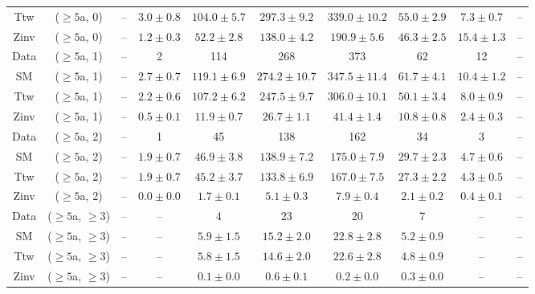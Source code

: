 \begin{table}[h!]
{\begin{tabular}{cccccccccc}
	Ttw & ($\ge5$a, 0) & -- & $3.0\pm 0.8$ & $104.0\pm 5.7$ & $297.3\pm 9.2$ & $339.0\pm 10.2$ & $55.0\pm 2.9$ & $7.3\pm 0.7$ & -- \\[0.5ex] 
	Zinv & ($\ge5$a, 0) & -- & $1.2\pm 0.3$ & $52.2\pm 2.8$ & $138.0\pm 4.2$ & $190.9\pm 5.6$ & $46.3\pm 2.5$ & $15.4\pm 1.3$ & -- \\[0.5ex] 
	Data & ($\ge5$a, 1) & -- & 2 & 114 & 268 & 373 & 62 & 12 & -- \\[0.5ex] 
	SM & ($\ge5$a, 1) & -- & $2.7\pm 0.7$ & $119.1\pm 6.9$ & $274.2\pm 10.7$ & $347.5\pm 11.4$ & $61.7\pm 4.1$ & $10.4\pm 1.2$ & -- \\[0.5ex] 
	Ttw & ($\ge5$a, 1) & -- & $2.2\pm 0.6$ & $107.2\pm 6.2$ & $247.5\pm 9.7$ & $306.0\pm 10.1$ & $50.1\pm 3.4$ & $8.0\pm 0.9$ & -- \\[0.5ex] 
	Zinv & ($\ge5$a, 1) & -- & $0.5\pm 0.1$ & $11.9\pm 0.7$ & $26.7\pm 1.1$ & $41.4\pm 1.4$ & $10.8\pm 0.8$ & $2.4\pm 0.3$ & -- \\[0.5ex] 
	Data & ($\ge5$a, 2) & -- & 1 & 45 & 138 & 162 & 34 & 3 & -- \\[0.5ex] 
	SM & ($\ge5$a, 2) & -- & $1.9\pm 0.7$ & $46.9\pm 3.8$ & $138.9\pm 7.2$ & $175.0\pm 7.9$ & $29.7\pm 2.3$ & $4.7\pm 0.6$ & -- \\[0.5ex] 
	Ttw & ($\ge5$a, 2) & -- & $1.9\pm 0.7$ & $45.2\pm 3.7$ & $133.8\pm 6.9$ & $167.0\pm 7.5$ & $27.3\pm 2.2$ & $4.3\pm 0.5$ & -- \\[0.5ex] 
	Zinv & ($\ge5$a, 2) & -- & $0.0\pm 0.0$ & $1.7\pm 0.1$ & $5.1\pm 0.3$ & $7.9\pm 0.4$ & $2.1\pm 0.2$ & $0.4\pm 0.1$ & -- \\[0.5ex] 
	Data & ($\ge5$a, $\ge3$) & -- & -- & 4 & 23 & 20 & 7 & -- & -- \\[0.5ex] 
	SM & ($\ge5$a, $\ge3$) & -- & -- & $5.9\pm 1.5$ & $15.2\pm 2.0$ & $22.8\pm 2.8$ & $5.2\pm 0.9$ & -- & -- \\[0.5ex] 
	Ttw & ($\ge5$a, $\ge3$) & -- & -- & $5.8\pm 1.5$ & $14.6\pm 2.0$ & $22.6\pm 2.8$ & $4.8\pm 0.9$ & -- & -- \\[0.5ex] 
	Zinv & ($\ge5$a, $\ge3$) & -- & -- & $0.1\pm 0.0$ & $0.6\pm 0.1$ & $0.2\pm 0.0$ & $0.3\pm 0.0$ & -- & -- \\[0.5ex] 
	\hline
	\hline
\end{tabular}}
\end{table}

